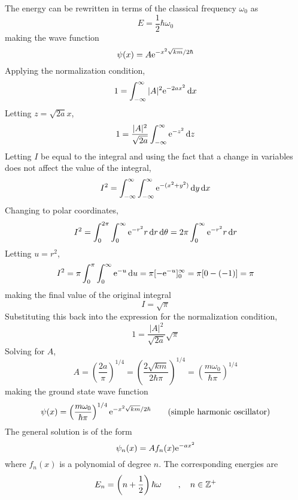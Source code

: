 \documentclass{subfiles}
\begin{document}
			The energy can be rewritten in terms of the classical frequency \(\omega_0\) as
			\[E = \frac{1}{2}\hbar\omega_0\]
			making the wave function
			\[\psi(x) = A\text{e}^{-x^2\sqrt{km}/2\hbar}\]
			Applying the normalization condition,
			\[1 = \int_{-\infty}^\infty |A|^2\text{e}^{-2ax^2}\dd{x}\]
			Letting \(z = \sqrt{2a}x\),
			\[
				1 = \frac{|A|^2}{\sqrt{2a}}\int_{-\infty}^\infty \text{e}^{-z^2} \dd{z}
			\]
			Letting \(I\) be equal to the integral and using the fact that a change in variables does not affect the value of the integral,
			\[I^2 = \int_{-\infty}^\infty\int_{-\infty}^\infty \text{e}^{-(x^2 + y^2)}\dd{y}\dd{x}\]
			Changing to polar coordinates,
			\[
				I^2 = \int_0^{2\pi}\int_0^\infty \text{e}^{-r^2}r\dd{r}\dd{\theta}
					= 2\pi\int_0^\infty \text{e}^{-r^2}r\dd{r}
			\]
			Letting \(u = r^2\),
			\[
				I^2 = \pi\int_0^\pi\int_0^\infty \text{e}^{-u}\dd{u}
					= \pi[-\text{e}^{-u}]_0^\infty = \pi[0 - (-1)] = \pi
			\]
			making the final value of the original integral
			\[I = \sqrt{\pi}\]
			Substituting this back into the expression for the normalization condition,
			\[1 = \frac{|A|^2}{\sqrt{2a}}\sqrt{\pi}\]
			Solving for \(A\),
			\[
				A = \left(\frac{2a}{\pi}\right)^{1/4}
					= \left(\frac{2\sqrt{km}}{2\hbar\pi}\right)^{1/4}
					= \left(\frac{m\omega_0}{\hbar\pi}\right)^{1/4}
			\]
			making the ground state wave function
			\[\psi(x) = \left(\frac{m\omega_0}{\hbar\pi}\right)^{1/4}\text{e}^{-x^2\sqrt{km}/2\hbar} \tag{simple harmonic oscillator}\]
			The general solution is of the form
			\[\psi_n(x) = Af_n(x)\text{e}^{-ax^2}\]
			where \(f_n(x)\) is a polynomial of degree \(n\). The corresponding energies are
			\[
				E_n = \left(n + \frac{1}{2}\right)\hbar\omega \qquad 
					, \quad n \in \mathbb{Z}^+
			\]
\end{document}
